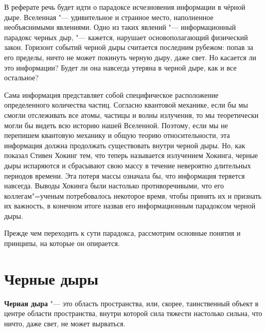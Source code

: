 \documentclass[bachelor, och, referat]{SCWorks}
\begin{document}


\tableofcontents





\intro
В реферате речь будет идти о парадоксе исчезновения информации в чёрной дыре.
Вселенная "--- удивительное и странное место, наполненное необъяснимыми явлениями. Одно из таких явлений "--- информационный парадокс черных дыр, "--- кажется, нарушает основополагающий физический закон. Горизонт событий черной дыры считается последним рубежом: попав за его пределы, ничто не может покинуть черную дыру, даже свет. Но касается ли это информации? Будет ли она навсегда утеряна в черной дыре, как и все остальное?

Сама информация представляет собой специфическое расположение определенного количества частиц. Согласно квантовой механике, если бы мы смогли отслеживать все атомы, частицы и волны излучения, то мы теоретически могли бы видеть всю историю нашей Вселенной. Поэтому, если мы не перепишем квантовую механику и общую теорию относительности, эта информация должна продолжать существовать внутри черной дыры. Но, как показал Стивен Хокинг тем, что теперь называется излучением Хокинга, черные дыры испаряются и сбрасывают свою массу в течение невероятно длительных периодов времени. Эта потеря массы означала бы, что информация теряется навсегда. Выводы Хокинга были настолько противоречивыми, что его коллегам"=ученым потребовалось некоторое время, чтобы принять их и признать их важность, в конечном итоге назвав его информационным парадоксом черной дыры.

Прежде чем переходить к сути парадокса, рассмотрим основные понятия и принципы, на которые он опирается.

\section{Черные дыры}
\textbf{Черная дыра} "--- это область пространства, или, скорее, таинственный объект в центре области пространства, внутри которой сила тяжести настолько сильна, что ничто, даже свет, не может вырваться.
\end{document}
